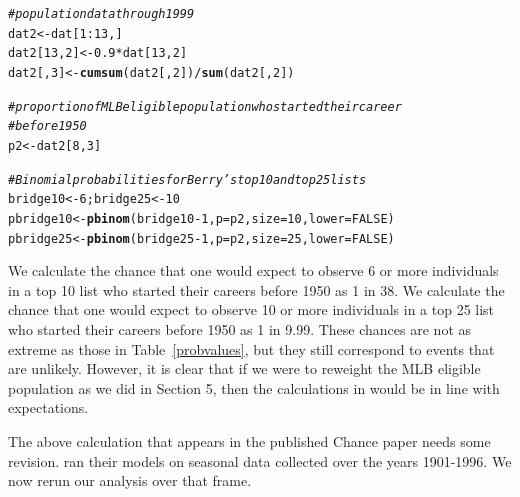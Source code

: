 \documentclass[11pt]{article}\usepackage[]{graphicx}\usepackage[]{color}
\makeatletter
\newcommand{\hlnum}[1]{\textcolor[rgb]{0.686,0.059,0.569}{#1}}%
\newcommand{\hlcom}[1]{\textcolor[rgb]{0.678,0.584,0.686}{\textit{#1}}}%
\newcommand{\hlopt}[1]{\textcolor[rgb]{0,0,0}{#1}}%
\newcommand{\hlstd}[1]{\textcolor[rgb]{0.345,0.345,0.345}{#1}}%
\newcommand{\hlkwb}[1]{\textcolor[rgb]{0.69,0.353,0.396}{#1}}%
\newcommand{\hlkwc}[1]{\textcolor[rgb]{0.333,0.667,0.333}{#1}}%
\newcommand{\hlkwd}[1]{\textcolor[rgb]{0.737,0.353,0.396}{\textbf{#1}}}%
\newenvironment{kframe}{%
 \def\at@end@of@kframe{}%
 \ifinner\ifhmode%
  \def\at@end@of@kframe{\end{minipage}}%
  \begin{minipage}{\columnwidth}%
 \fi\fi%
 \def\FrameCommand##1{\hskip\@totalleftmargin \hskip-\fboxsep
 \colorbox{shadecolor}{##1}\hskip-\fboxsep
     \hskip-\linewidth \hskip-\@totalleftmargin \hskip\columnwidth}%
 \MakeFramed {\advance\hsize-\width
   \@totalleftmargin\z@ \linewidth\hsize
   \@setminipage}}%
 {\par\unskip\endMakeFramed%
 \at@end@of@kframe}
\newenvironment{knitrout}{}{} %
\makeatother
\begin{document}
\begin{knitrout}
\color{fgcolor}\begin{kframe}
\begin{alltt}
\hlcom{# population data through 1999}
\hlstd{dat2} \hlkwb{<-} \hlstd{dat[}\hlnum{1}\hlopt{:}\hlnum{13}\hlstd{, ]}
\hlstd{dat2[}\hlnum{13}\hlstd{,} \hlnum{2}\hlstd{]} \hlkwb{<-} \hlnum{0.9} \hlopt{*} \hlstd{dat[}\hlnum{13}\hlstd{,} \hlnum{2}\hlstd{]}
\hlstd{dat2[,} \hlnum{3}\hlstd{]} \hlkwb{<-} \hlkwd{cumsum}\hlstd{(dat2[,} \hlnum{2}\hlstd{])} \hlopt{/} \hlkwd{sum}\hlstd{(dat2[,} \hlnum{2}\hlstd{])}

\hlcom{# proportion of MLB eligible population who started their career }
\hlcom{# before 1950}
\hlstd{p2} \hlkwb{<-} \hlstd{dat2[}\hlnum{8}\hlstd{,} \hlnum{3}\hlstd{]}

\hlcom{# Binomial probabilities for Berry's top 10 and top 25 lists}
\hlstd{bridge10} \hlkwb{<-} \hlnum{6}\hlstd{; bridge25} \hlkwb{<-} \hlnum{10}
\hlstd{pbridge10} \hlkwb{<-} \hlkwd{pbinom}\hlstd{(bridge10} \hlopt{-} \hlnum{1}\hlstd{,} \hlkwc{p} \hlstd{= p2,} \hlkwc{size} \hlstd{=} \hlnum{10}\hlstd{,} \hlkwc{lower} \hlstd{=} \hlnum{FALSE}\hlstd{)}
\hlstd{pbridge25} \hlkwb{<-} \hlkwd{pbinom}\hlstd{(bridge25} \hlopt{-} \hlnum{1}\hlstd{,} \hlkwc{p} \hlstd{= p2,} \hlkwc{size} \hlstd{=} \hlnum{25}\hlstd{,} \hlkwc{lower} \hlstd{=} \hlnum{FALSE}\hlstd{)}
\end{alltt}
\end{kframe}
\end{knitrout}

We calculate the chance that one would expect to 
observe 6 or more individuals in a top 10 list who started their careers 
before 1950 as 1 in 38. 
We calculate the chance that one would expect to observe 10 or more 
individuals in a top 25 list who started their careers before 1950 as 
1 in 9.99.  These chances are not as extreme 
as those in Table~\ref{probvalues}, but they still correspond to events 
that are unlikely.  However, it is clear that if we were to reweight the 
MLB eligible population as we did in Section 5, then the calculations in 
\citet{berry1999eras} would be in line with expectations.


The above calculation that appears in the published Chance paper needs some revision. \cite{berry1999eras} ran their models on seasonal data collected over the years 1901-1996. We now rerun our analysis over that frame.
\end{document}
